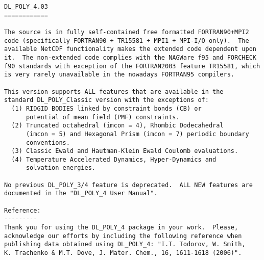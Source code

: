 \label{readme}
\begin{verbatim}
DL_POLY_4.03
============

The source is in fully self-contained free formatted FORTRAN90+MPI2
code (specifically FORTRAN90 + TR15581 + MPI1 + MPI-I/O only).  The
available NetCDF functionality makes the extended code dependent upon
it.  The non-extended code complies with the NAGWare f95 and FORCHECK
f90 standards with exception of the FORTRAN2003 feature TR15581, which
is very rarely unavailable in the nowadays FORTRAN95 compilers.

This version supports ALL features that are available in the
standard DL_POLY_Classic version with the exceptions of:
  (1) RIDGID BODIES linked by constraint bonds (CB) or
      potential of mean field (PMF) constraints.
  (2) Truncated octahedral (imcon = 4), Rhombic Dodecahedral
      (imcon = 5) and Hexagonal Prism (imcon = 7) periodic boundary
      conventions.
  (3) Classic Ewald and Hautman-Klein Ewald Coulomb evaluations.
  (4) Temperature Accelerated Dynamics, Hyper-Dynamics and
      solvation energies.

No previous DL_POLY_3/4 feature is deprecated.  ALL NEW features are
documented in the "DL_POLY_4 User Manual".

Reference:
---------
Thank you for using the DL_POLY_4 package in your work.  Please,
acknowledge our efforts by including the following reference when
publishing data obtained using DL_POLY_4: "I.T. Todorov, W. Smith,
K. Trachenko & M.T. Dove, J. Mater. Chem., 16, 1611-1618 (2006)".


\end{verbatim}
